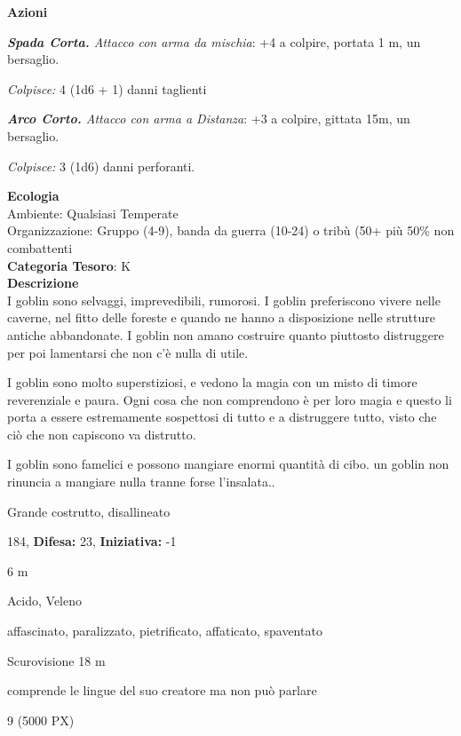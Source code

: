 \begin{multicols}{2}
{\textbf{Azioni}

\emph{\textbf{Spada Corta.} Attacco con arma da mischia}: +4 a colpire, portata 1 m, un bersaglio.

\emph{Colpisce:} 4 (1d6 + 1) danni taglienti

\emph{\textbf{Arco Corto.} Attacco con arma a Distanza}: +3 a colpire, gittata 15m, un bersaglio.

\emph{Colpisce:} 3 (1d6) danni perforanti.

\textbf{Ecologia}\\
Ambiente: Qualsiasi Temperate\\
Organizzazione: Gruppo (4-9), banda da guerra (10-24) o tribù (50+ più 50\% non combattenti\\
\textbf{Categoria Tesoro}: K\\
\textbf{Descrizione}\\
I goblin sono selvaggi, imprevedibili, rumorosi.
I goblin preferiscono vivere nelle caverne, nel fitto delle foreste e quando ne hanno a disposizione nelle strutture antiche abbandonate. I goblin non amano costruire quanto piuttosto distruggere per poi lamentarsi che non c'è nulla di utile.

I goblin sono molto superstiziosi, e vedono la magia con un misto di timore reverenziale e paura. Ogni cosa che non comprendono è per loro magia e questo li porta a essere estremamente sospettosi di tutto e a distruggere tutto, visto che ciò che non capiscono va distrutto.

I goblin sono famelici e possono mangiare enormi quantità di cibo. un goblin non rinuncia a mangiare nulla tranne forse l'insalata..

\noindent
\begin{description}[noitemsep, topsep=0pt, parsep=0pt, partopsep=0pt, leftmargin=0cm, labelwidth=2.2cm]
	\item[\textbf{Taglia/Tipo:}] Grande costrutto, disallineato
	\item[\textbf{Caratt.:}] 
	\item[\textbf{Punti Ferita:}] 184,  \textbf{Difesa:} 23,  \textbf{Iniziativa:} -1
	\item[\textbf{Movimento:}] 6 m
	\item[\textbf{Tiri Salvez.:}] 
	\item[\textbf{Imm. Danni:}] Acido, Veleno
	\item[\textbf{Immunità:}] affascinato, paralizzato, pietrificato, affaticato, spaventato
	\item[\textbf{Sensi:}] Scurovisione 18 m
	\item[\textbf{Linguaggi:}] comprende le lingue del suo creatore ma non può parlare
	\item[\textbf{Sfida:}] 9 (5000 PX)\smallskip
\end{description}

}
\end{multicols}
